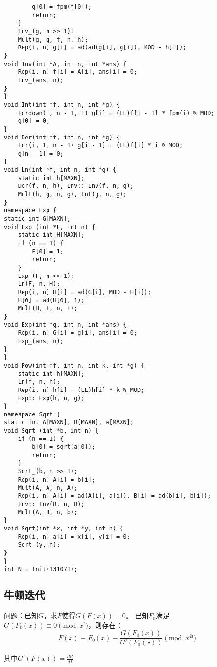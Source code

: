 \documentclass[twocolumn,a4]{article}
\begin{document}
\begin{lstlisting}
        g[0] = fpm(f[0]);
        return;
    }
    Inv_(g, n >> 1);
    Mult(g, g, f, n, h);
    Rep(i, n) g[i] = ad(ad(g[i], g[i]), MOD - h[i]);
}
void Inv(int *A, int n, int *ans) {
    Rep(i, n) f[i] = A[i], ans[i] = 0;
    Inv_(ans, n);
}
}
void Int(int *f, int n, int *g) {
    Fordown(i, n - 1, 1) g[i] = (LL)f[i - 1] * fpm(i) % MOD;
    g[0] = 0;
}
void Der(int *f, int n, int *g) {
    For(i, 1, n - 1) g[i - 1] = (LL)f[i] * i % MOD;
    g[n - 1] = 0;
}
void Ln(int *f, int n, int *g) {
    static int h[MAXN];
    Der(f, n, h), Inv:: Inv(f, n, g);
    Mult(h, g, n, g), Int(g, n, g);
}
namespace Exp {
static int G[MAXN];
void Exp_(int *F, int n) {
    static int H[MAXN];
    if (n == 1) {
        F[0] = 1;
        return;
    }
    Exp_(F, n >> 1);
    Ln(F, n, H);
    Rep(i, n) H[i] = ad(G[i], MOD - H[i]);
    H[0] = ad(H[0], 1);
    Mult(H, F, n, F);
}
void Exp(int *g, int n, int *ans) {
    Rep(i, n) G[i] = g[i], ans[i] = 0;
    Exp_(ans, n);
}
}
void Pow(int *f, int n, int k, int *g) {
    static int h[MAXN];
    Ln(f, n, h);
    Rep(i, n) h[i] = (LL)h[i] * k % MOD;
    Exp:: Exp(h, n, g);
}
namespace Sqrt {
static int A[MAXN], B[MAXN], a[MAXN];
void Sqrt_(int *b, int n) {
    if (n == 1) {
        b[0] = sqrt(a[0]);
        return;
    }
    Sqrt_(b, n >> 1);
    Rep(i, n) A[i] = b[i];
    Mult(A, A, n, A);
    Rep(i, n) A[i] = ad(A[i], a[i]), B[i] = ad(b[i], b[i]);
    Inv:: Inv(B, n, B);
    Mult(A, B, n, b);
}
void Sqrt(int *x, int *y, int n) {
    Rep(i, n) a[i] = x[i], y[i] = 0;
    Sqrt_(y, n);
}
}
int N = Init(131071);
\end{lstlisting}

\subsection{牛顿迭代}
问题：已知$G$，求$F$使得$G(F(x)) = 0$。
已知$F_0$满足$G(F_0(x))\equiv 0 \pmod{x^t}$，则存在：
$$
F(x) \equiv F_0(x) - \frac{G(F_0(x))}{G'(F_0(x))} \pmod {x^{2t}}
$$

其中$G'(F(x)) = \frac{dG}{dF}$
\end{document}
